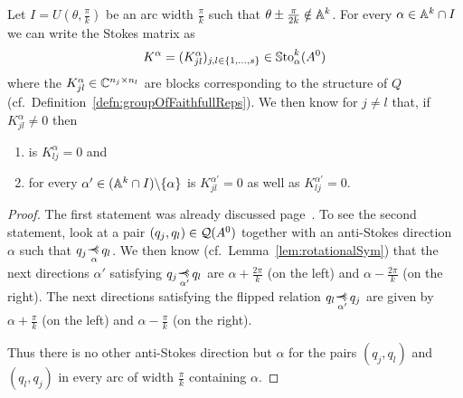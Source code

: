 \begin{prop}\label{prop:propAboutCommonStructure}
  Let $I=U(\theta,\frac{\pi}{k})$ be an arc width $\frac{\pi}{k}$ such that
  $\theta\pm\frac{\pi}{2k}\notin\mathbb{A}^k$.
  For every $\alpha\in\mathbb{A}^k\cap I$ we can write the Stokes matrix as
  \[
    K^\alpha=(K^\alpha_{jl})_{j,l\in\{1,\dots,s\}}\in\operatorname{\mathbb{S}to}_\alpha^k(A^0)
  \]
  where the $K^\alpha_{jl}\in\mathbb{C}^{n_j\times n_l}$ are blocks corresponding to
  the structure of $Q$ (cf.\ Definition~\ref{defn:groupOfFaithfullReps}).
  We then know for $j\neq l$ that, if $K^\alpha_{jl}\neq0$ then
  \begin{enumerate}
  \item is $K^\alpha_{lj}=0$ and
  \item for every $\alpha'\in(\mathbb{A}^k\cap I)\backslash\{\alpha\}$ is
    $K^{\alpha'}_{jl}=0$ as well as $K^{\alpha'}_{lj}=0$.
  \end{enumerate}
\end{prop}
\begin{proof}
  The first statement was already discussed
  page~\pageref{page:firstStatementOnTheStructure}.
  To see the second statement, look at a pair $(q_j,q_l)\in\mathcal{Q}(A^0)$ together
  with an anti-Stokes direction $\alpha$ such that $q_j\myrel{\alpha}q_l$. We
  then know (cf.\ Lemma~\ref{lem:rotationalSym}) that the next directions
  $\alpha'$ satisfying $q_j\myrel{\alpha'}q_l$ are $\alpha+\frac{2\pi}{k}$ (on
  the left) and $\alpha-\frac{2\pi}{k}$ (on the right).
  The next directions satisfying the flipped relation $q_l\myrel{\alpha'}q_j$
  are given by $\alpha+\frac{\pi}{k}$ (on the left) and
  $\alpha-\frac{\pi}{k}$ (on the right).

  Thus there is no other anti-Stokes direction but $\alpha$ for the pairs
  $(q_j,q_l)$ and $(q_l,q_j)$ in every arc of width $\frac{\pi}{k}$ containing
  $\alpha$.
\end{proof}
